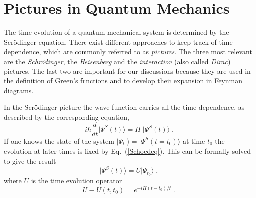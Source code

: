 %
%
%
%
% 


\section{Pictures in Quantum Mechanics}

The time evolution of a quantum mechanical system is determined by the Scr\"odinger equation. There exist different approaches to keep track of time dependence, which are commonly referred to as {\em pictures}.
The three most relevant are the {\em Schr\"odinger},  the {\em Heisenberg} and  the {\em interaction} (also called {\em Dirac}) pictures. The last two are important for our discussions because they are used in the definition of Green's functions and to develop their expansion in Feynman diagrams.

In the Scr\"odinger picture the wave function carries all the time dependence, as described by the corresponding equation,
\begin{equation}
  i \hbar \frac{d}{d t} \vert\Psi^S(t)\rangle = H \; \vert\Psi^S(t)\rangle \; .
\label{Schoedeq}
\end{equation}
If one knows the state of the system $\vert\Psi_{t_0}\rangle=\vert\Psi^S(t=t_0)\rangle$ at time $t_0$ the evolution at later times is fixed by Eq.~(\ref{Schoedeq}). This can be formally solved to give the result
\begin{equation}
 \vert\Psi^S(t)\rangle = U \vert\Psi_{t_0} \rangle \; ,
\label{PhiSP}
\end{equation}
where $U$ is the time evolution operator
\begin{equation}
 U \equiv U(t, t_0) = e^{-i H (t-t_0)/\hbar} \; .
\label{UTimeEvol}
\end{equation}


